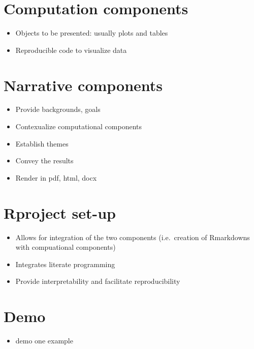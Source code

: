 \documentclass[]{book}
\providecommand{\tightlist}{%
  \setlength{\itemsep}{0pt}\setlength{\parskip}{0pt}}
\begin{document}
\hypertarget{computation-components}{%
\section{Computation components}\label{computation-components}}

\begin{itemize}
\tightlist
\item
  Objects to be presented: usually plots and tables
\item
  Reproducible code to visualize data
\end{itemize}

\hypertarget{narrative-components}{%
\section{Narrative components}\label{narrative-components}}

\begin{itemize}
\tightlist
\item
  Provide backgrounds, goals
\item
  Contexualize computational components
\item
  Establish themes
\item
  Convey the results
\item
  Render in pdf, html, docx
\end{itemize}

\hypertarget{rproject-set-up}{%
\section{Rproject set-up}\label{rproject-set-up}}

\begin{itemize}
\tightlist
\item
  Allows for integration of the two components (i.e.~creation of Rmarkdowns with compuational components)
\item
  Integrates literate programming
\item
  Provide interpretability and facilitate reproducibility
\end{itemize}

\hypertarget{demo}{%
\section{Demo}\label{demo}}

\begin{itemize}
\tightlist
\item
  demo one example
\end{itemize}
\end{document}
